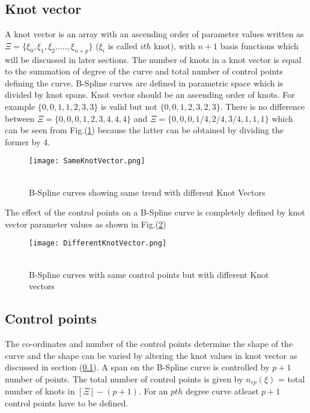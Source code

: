 \documentclass[11pt]{article}
\begin{document}
\subsection{Knot vector } \label{KnotVectorSection}
A knot vector is an array with an ascending order of parameter values written as
$\Xi = \{ \xi_0,\xi_1,\xi_2.....,\xi_{n+p}\}$
($\xi_i$ is called $ith$ knot), with $n+1$ basis functions which will be discussed in later sections.
The number of knots in a knot vector is equal to the summation of degree of the curve and total number of control points defining the curve. 
B-Spline curves are defined in parametric space which is divided by knot spans. 
Knot vector should be an ascending order of knots. For example $\{0,0,1,1,2,3,3\}$ is valid but not $\{0,0,1,2,3,2,3\}$.
There is no difference between $\Xi = \{0,0,0,1,2,3,4,4,4\}$ and $\Xi = \{0,0,0,1/4,2/4,3/4,1,1,1\}$ which can be seen from Fig.(\ref{SameKnotVector}) because the latter can be obtained by dividing the former by 4.
\begin{figure}[H]
	\begin{center}
		\texttt{[image: SameKnotVector.png]} 
		\caption{\\B-Spline curves showing same trend with different Knot Vectors}\label{SameKnotVector}
	\end{center}	
\end{figure}
The effect of the control points on a B-Spline curve is completely defined by knot vector parameter values as shown in Fig.(\ref{DifferentKnotVector})
\begin{figure}[H]
	\begin{center}
		\texttt{[image: DifferentKnotVector.png]} 
		\caption{\\B-Spline curves with same control points but with different Knot vectors}\label{DifferentKnotVector}
	\end{center}	
\end{figure}

\subsection{Control points }
The co-ordinates and number of the control points determine the shape of the curve and the shape can be varied by altering the knot values in knot vector as discussed in section (\ref{KnotVectorSection}).
A span on the B-Spline curve is controlled by $p+1$ number of points.
The total
number of control points is given by $n_{cp}(\xi)$ = total number of knots in
$[\Xi] - (p+1)$. For an $pth$ degree curve atleast $p+1$ control points have to be defined.  
\end{document}
